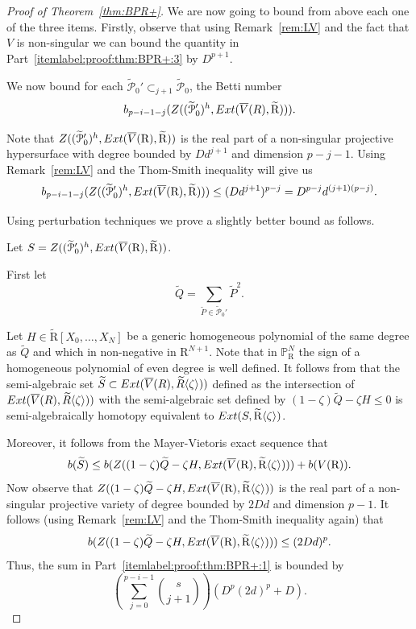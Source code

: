 \documentclass[10pt]{amsart}
\theoremstyle{definition}
\theoremstyle{remark}
\numberwithin{equation}{section}
\newcommand {\R} {\mathrm{R}}
\newcommand {\ZZ} {{\rm Z}}
\newcommand {\la}   {{\langle}}
\newcommand {\ra}   {{\rangle}}
\newcommand {\E} {{\rm Ext}}
\newcommand {\PP}     {\mathbb{P}} %
\begin{document}
\begin{proof}[Proof of Theorem~\ref{thm:BPR+}]
We are now going to bound from above each one of the three items.
Firstly, observe that using Remark~\ref{rem:LV} 
and the fact that
$V$ is non-singular we can bound the quantity in Part~\eqref{itemlabel:proof:thm:BPR+:3} by $D^{p+1}$.

We now bound for each 
$\widetilde{\mathcal{P}}_0' \subset_{j+1} \widetilde{\mathcal{P}}_0$, the Betti number
\[
b_{p-i-1-j}(\ZZ((\widetilde{\mathcal{P}}_0')^h, \E(\overline{V}(R),\widetilde{\R}))).
\]

Note that $\ZZ((\widetilde{\mathcal{P}}_0')^h, \E(\overline{V}(\R),\widetilde{\R}))$ is the real part of a non-singular projective hypersurface with degree bounded by $D d^{j+1}$ and dimension $p-j -1$.
Using Remark~\ref{rem:LV} and the Thom-Smith inequality will give us
\[
b_{p-i-1-j}(\ZZ((\widetilde{\mathcal{P}}_0')^h, \E(\overline{V}(\R),\widetilde{\R}))) \leq (D d^{j+1})^{p-j} = D^{p-j} d^{(j+1)(p-j)}.
\]

Using perturbation techniques we prove a slightly better bound as follows.

Let $S = \ZZ((\widetilde{\mathcal{P}}_0')^h, \E(\overline{V}(\R),\widetilde{\R}))$.

First let 
\[
\widetilde{Q} = \sum_{\widetilde{P} \in \widetilde{\mathcal{P}}_0'} \widetilde{P}^2. 
\]

Let $H \in \widetilde{\R}[X_0,\ldots,X_N]$ be a generic homogeneous polynomial
of the same degree as $\widetilde{Q}$ and which in non-negative in $\R^{N+1}$.
Note that in $\PP_\R^N$ the sign of a homogeneous polynomial of even degree is well defined. It follows from \cite[Lemma 16.17]{BPRbook2} that
the semi-algebraic set $\widetilde{S} \subset \E(\overline{V}(R),\widetilde{R}\la\zeta\ra))$ defined as the intersection of 
$\E(\overline{V}(R),\widetilde{R}\la\zeta\ra))$ with the semi-algebraic set defined by $(1-\zeta)\widetilde{Q} - \zeta H \leq 0$ is semi-algebraically homotopy equivalent to $ \E(S,\widetilde{\R}\la\zeta\ra)$.

Moreover, it follows from the Mayer-Vietoris exact sequence that 
\[
b(\widetilde{S}) \leq b(\ZZ((1-\zeta)\widetilde{Q} - \zeta H, \E(\overline{V}(\R),\widetilde{\R}\la\zeta\ra))) + b(V(\R)).
\]
Now observe that $\ZZ((1-\zeta)\widetilde{Q} - \zeta H, \E(\overline{V}(\R),\widetilde{\R}\la\zeta\ra))$ is the real part of a non-singular projective variety of degree bounded by $2 D d$ and dimension $p-1$.
It follows (using Remark~\ref{rem:LV} and the Thom-Smith inequality again) that 
\[
b(\ZZ((1-\zeta)\widetilde{Q} - \zeta H, \E(\overline{V}(\R),\widetilde{\R}\la\zeta\ra))) \leq (2 D d)^{p}.
\]
Thus, the sum in Part~\eqref{itemlabel:proof:thm:BPR+:1} is bounded by
\[
\left(\sum_{j=0}^{p-i-1} \binom{s}{j+1}\right)(D^p(2d)^{p} + D).
\]


\end{proof}
\end{document}
